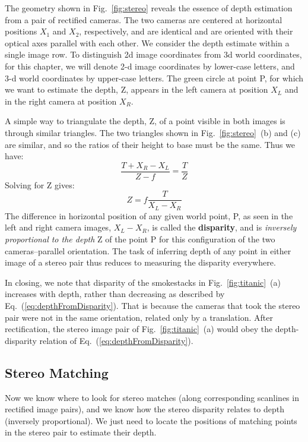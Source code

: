 The geometry shown in Fig.~\ref{fig:stereo} reveals the essence of depth estimation from a pair of rectified cameras.   The two cameras are centered  at horizontal positions $X_1$ and $X_2$, respectively, and are identical and are oriented with their optical axes parallel with each other.  We consider the depth estimate within a single image row.  To distinguish 2d image coordinates from 3d world coordinates, for this chapter, we will denote 2-d image coordinates by lower-case letters, and 3-d world coordinates by upper-case letters. The green circle at point P, for which we want to estimate the depth, Z, appears in the left camera at position $X_L$ and in the right camera at position $X_R$.  

A simple way to triangulate the depth, Z, of a point visible in both images is through similar triangles.  The two triangles shown in  Fig.~\ref{fig:stereo}~(b) and (c) are similar, and so the ratios of their height to base must be the same.  Thus we have:
\begin{equation}
    \frac{T+X_R-X_L}{Z-f} = \frac{T}{Z}
\end{equation}
Solving for Z gives:
\begin{equation}
    Z = f \frac{T}{X_L-X_R}
    \label{eq:depthFromDisparity}
\end{equation}
The difference in horizontal position of any given world point, P, as seen in the left and right camera images, $X_L - X_R$, is called the {\bf disparity}, and is {\em inversely proportional to the depth} Z of the point P for this configuration of the two cameras--parallel orientation.  The task of inferring depth of any point in either image of a stereo pair thus reduces to measuring the disparity everywhere.

In closing, we note that disparity of the smokestacks in Fig.~\ref{fig:titanic}~(a) increases with depth, rather than decreasing as described by Eq.~(\ref{eq:depthFromDisparity}).  That is because the cameras that took the stereo pair were not in the same orientation, related only by a translation.  After rectification, the stereo image pair of Fig.~\ref{fig:titanic}~(a) would obey the depth-disparity relation of Eq.~(\ref{eq:depthFromDisparity}).



\subsection{Stereo Matching}
Now we know where to look for stereo matches (along corresponding scanlines in rectified image pairs), and we know how the stereo disparity relates to depth (inversely proportional).  We just need to locate the positions of matching points in the stereo pair to estimate their depth.

